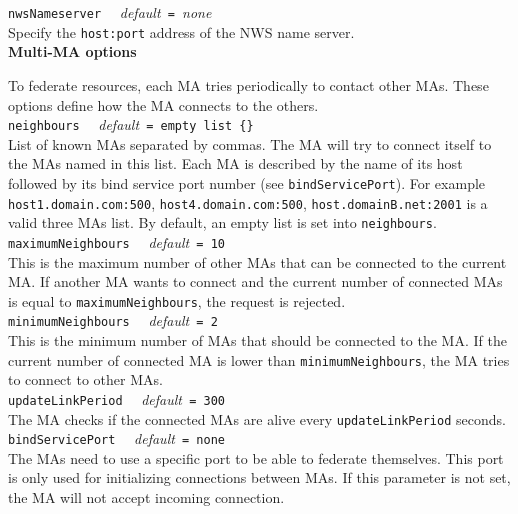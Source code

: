 \noindent
\texttt{nwsNameserver} \ \ \emph{default}\texttt{ = }\emph{none}\\ Specify the
\texttt{host:port} address of the NWS name server.\\

\noindent
\textbf{Multi-MA options}

\label{sec:multimaconfig}

To federate resources, each MA tries periodically to contact other MAs. These
options define how the MA connects to the others.\\

\noindent
\texttt{neighbours} \ \ \emph{default}\texttt{ = empty list \{\}}\\ List of
known MAs separated by commas. The MA will try to connect itself to the MAs
named in this list. Each MA is described by the name of its host followed by
its bind service port number (see \texttt{bindServicePort}). For example
\texttt{host1.domain.com:500}, \texttt{host4.domain.com:500},
\texttt{host.domainB.net:2001} is a valid three MAs list. By default, an empty
list is set into \texttt{neighbours}.\\

\noindent
\texttt{maximumNeighbours} \ \ \emph{default}\texttt{ = 10}\\ This is the
maximum number of other MAs that can be connected to the current MA.  If
another MA wants to connect and the current number of connected MAs is equal to
\texttt{maximumNeighbours}, the request is rejected.\\

\noindent
\texttt{minimumNeighbours} \ \ \emph{default}\texttt{ = 2}\\ This is the
minimum number of MAs that should be connected to the MA. If the current number
of connected MA is lower than \texttt{minimumNeighbours}, the MA tries to
connect to other MAs.\\

\noindent
\texttt{updateLinkPeriod} \ \ \emph{default}\texttt{ = 300}\\ The MA checks if
the connected MAs are alive every \texttt{updateLinkPeriod} seconds.\\

\noindent
\texttt{bindServicePort} \ \ \emph{default}\texttt{ = none}\\ The MAs need to
use a specific port to be able to federate themselves. This port is only used
for initializing connections between MAs. If this parameter is not set, the MA
will not accept incoming connection.\\

